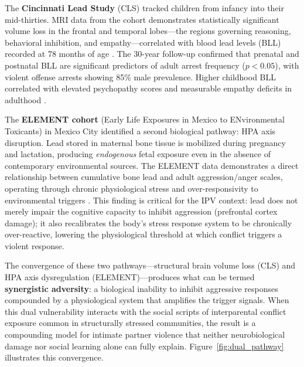 \documentclass[12pt, letterpaper]{article}
\begin{document}
The \textbf{Cincinnati Lead Study} (CLS) tracked children from infancy into their mid-thirties. MRI data from the cohort demonstrates statistically significant volume loss in the frontal and temporal lobes---the regions governing reasoning, behavioral inhibition, and empathy---correlated with blood lead levels (BLL) recorded at 78 months of age \citep{cecil2008}. The 30-year follow-up confirmed that prenatal and postnatal BLL are significant predictors of adult arrest frequency ($p < 0.05$), with violent offense arrests showing 85\% male prevalence. Higher childhood BLL correlated with elevated psychopathy scores and measurable empathy deficits in adulthood \citep{wright2008}.

The \textbf{ELEMENT cohort} (Early Life Exposures in Mexico to ENvironmental Toxicants) in Mexico City identified a second biological pathway: HPA axis disruption. Lead stored in maternal bone tissue is mobilized during pregnancy and lactation, producing \textit{endogenous} fetal exposure even in the absence of contemporary environmental sources. The ELEMENT data demonstrates a direct relationship between cumulative bone lead and adult aggression/anger scales, operating through chronic physiological stress and over-responsivity to environmental triggers \citep{element2015}. This finding is critical for the IPV context: lead does not merely impair the cognitive capacity to inhibit aggression (prefrontal cortex damage); it also recalibrates the body's stress response system to be chronically over-reactive, lowering the physiological threshold at which conflict triggers a violent response.

The convergence of these two pathways---structural brain volume loss (CLS) and HPA axis dysregulation (ELEMENT)---produces what can be termed \textbf{synergistic adversity}: a biological inability to inhibit aggressive responses compounded by a physiological system that amplifies the trigger signals. When this dual vulnerability interacts with the social scripts of interparental conflict exposure common in structurally stressed communities, the result is a compounding model for intimate partner violence that neither neurobiological damage nor social learning alone can fully explain. Figure~\ref{fig:dual_pathway} illustrates this convergence.
\end{document}
